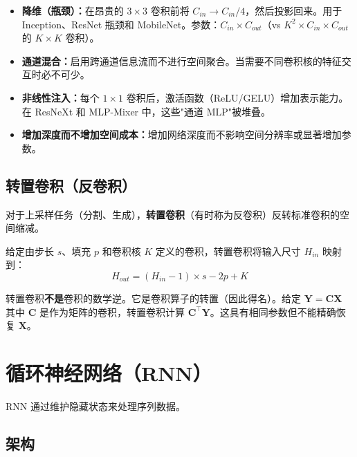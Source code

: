 \begin{properties}
\begin{itemize}
    \item \textbf{降维（瓶颈）：}在昂贵的 $3 \times 3$ 卷积前将 $C_{in} \to C_{in}/4$，然后投影回来。用于 Inception、ResNet 瓶颈和 MobileNet。参数：$C_{in} \times C_{out}$（vs $K^2 \times C_{in} \times C_{out}$ 的 $K \times K$ 卷积）。
    \item \textbf{通道混合：}启用跨通道信息流而不进行空间聚合。当需要不同卷积核的特征交互时必不可少。
    \item \textbf{非线性注入：}每个 $1 \times 1$ 卷积后，激活函数（ReLU/GELU）增加表示能力。在 ResNeXt 和 MLP-Mixer 中，这些"通道 MLP"被堆叠。
    \item \textbf{增加深度而不增加空间成本：}增加网络深度而不影响空间分辨率或显著增加参数。
\end{itemize}
\end{properties}

\subsection{转置卷积（反卷积）}

对于上采样任务（分割、生成），\textbf{转置卷积}（有时称为反卷积）反转标准卷积的空间缩减。

给定由步长 $s$、填充 $p$ 和卷积核 $K$ 定义的卷积，转置卷积将输入尺寸 $H_{in}$ 映射到：
\begin{equation}
H_{out} = (H_{in} - 1) \times s - 2p + K
\end{equation}

\begin{note}
转置卷积\textbf{不是}卷积的数学逆。它是卷积算子的转置（因此得名）。给定 $\mathbf{Y} = \mathbf{C}\mathbf{X}$ 其中 $\mathbf{C}$ 是作为矩阵的卷积，转置卷积计算 $\mathbf{C}^\top \mathbf{Y}$。这具有相同参数但不能精确恢复 $\mathbf{X}$。
\end{note}

\section{循环神经网络（RNN）}

RNN 通过维护隐藏状态来处理序列数据。

\subsection{架构}

